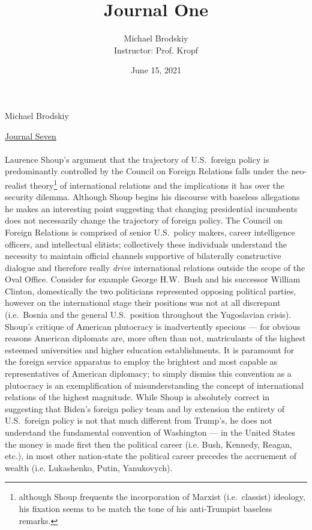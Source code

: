 \documentclass[12pt]{article}
\title{Journal One}
\date{June 15, 2021}
\author{Michael Brodskiy\\ \small Instructor: Prof. Kropf}
\begin{document}
\flushleft Michael Brodskiy

\begin{center}

 \underline{Journal Seven}

\end{center}

\begin{justify}
  \paragraph{} Laurence Shoup's argument that the trajectory of U.S.\ foreign policy is predominantly controlled by the Council on Foreign Relations falls under the neo-realist theory\footnote{although Shoup frequents the incorporation of Marxist (i.e.\ classist) ideology, his fixation seems to be match the tone of his anti-Trumpist baseless remarks.} of international relations and the implications it has over the security dilemma. Although Shoup begins his discourse with baseless allegations he makes an interesting point suggesting that changing presidential incumbents does not necessarily change the trajectory of foreign policy. The Council on Foreign Relations is comprised of senior U.S.\ policy makers, career intelligence officers, and intellectual elitists; collectively these individuals understand the necessity to maintain official channels supportive of bilaterally constructive dialogue and therefore really \emph{drive} international relations outside the scope of the Oval Office. Consider for example George H.W.\ Bush and his successor William Clinton, domestically the two politicians represented opposing political parties, however on the international stage their positions was not at all discrepant (i.e.\ Bosnia and the general U.S.\ position throughout the Yugoslavian crisis). Shoup's critique of American plutocracy is inadvertently specious — for obvious reasons American diplomats are, more often than not, matriculants of the highest esteemed universities and higher education establishments. It is paramount for the foreign service apparatus to employ the brightest and most capable as representatives of American diplomacy; to simply dismiss this convention as a plutocracy is an exemplification of misunderstanding the concept of international relations of the highest magnitude. While Shoup is absolutely correct in suggesting that Biden’s foreign policy team and by extension  the entirety of U.S.\ foreign policy is not that much different from Trump’s, he does not understand the fundamental convention of Washington — in the United States the money is made first then the political career (i.e. Bush, Kennedy, Reagan, etc.), in most other nation-state the political career precedes the accruement of wealth (i.e. Lukashenko, Putin, Yanukovych).
\end{justify}
\end{document}
